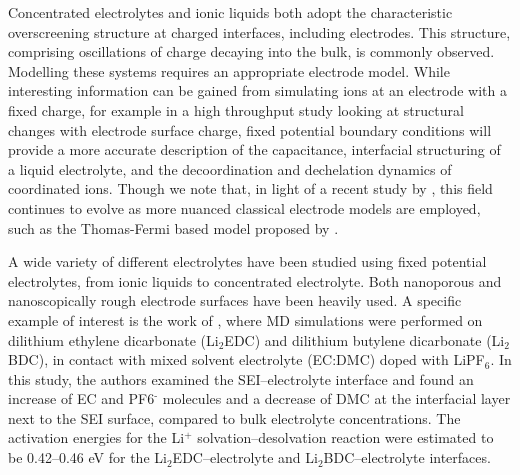 \documentclass[../main.tex]{subfiles}
\begin{document}
Concentrated electrolytes and ionic liquids both adopt the characteristic overscreening structure at charged interfaces, including electrodes. This structure, comprising oscillations of charge decaying into the bulk, is commonly observed.\cite{coles_nanostructure_2017, merlet_simulating_2013} Modelling these systems requires an appropriate electrode model. While interesting information can be gained from simulating ions at an electrode with a fixed charge, for example in a high throughput study looking at structural changes with electrode surface charge,\cite{coles_nanostructure_2017} fixed potential boundary conditions will provide a more accurate description of the capacitance, \cite{merlet_simulating_2013, scalfi_semiclassical_2020} interfacial structuring of a liquid electrolyte,\cite{coles_simulation_2019, vatamanu_ramifications_2017, li_capacitive_2018} and the decoordination and dechelation dynamics of coordinated ions.\cite{vatamanu_molecular_2009} Though we note that, in light of a recent study by \citeauthor{scalfi_semiclassical_2020}, this field continues to evolve as more nuanced classical electrode models are employed, such as the Thomas-Fermi based model proposed by \citeauthor{scalfi_semiclassical_2020}. \cite{scalfi_semiclassical_2020}

A wide variety of different electrolytes have been studied using fixed potential electrolytes, from ionic liquids to concentrated electrolyte. Both nanoporous \cite{merlet_highly_2013, merlet_molecular_2012, vatamanu_molecular_2009, vatamanu_ramifications_2017} and nanoscopically rough electrode surfaces have been heavily used.\cite{vatamanu_influence_2011} A specific example of interest is the work of \citeauthor{borodin_interfacial_2014}, where MD simulations were performed on dilithium ethylene dicarbonate (Li$_2$EDC) and dilithium butylene dicarbonate (Li$_2$BDC), in contact with mixed solvent electrolyte (EC:DMC) doped with LiPF$_6$.\cite{borodin_interfacial_2014} In this study, the authors examined the SEI–electrolyte interface and found an increase of EC and PF6$^{\text{-}}$ molecules and a decrease of DMC at the interfacial layer next to the SEI surface, compared to bulk electrolyte concentrations. The activation energies for the Li$^{+}$ solvation–desolvation reaction were estimated to be 0.42--0.46 eV for the Li$_2$EDC–electrolyte and Li$_2$BDC–electrolyte interfaces.
    
\end{document}
